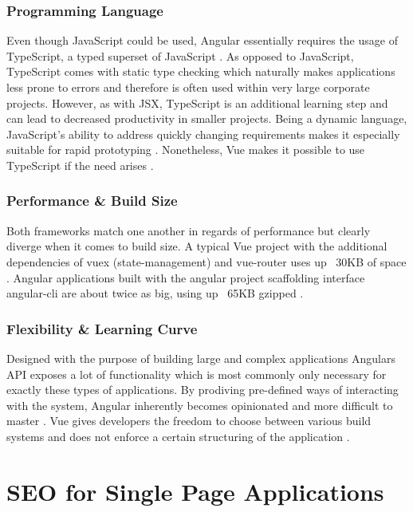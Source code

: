 \subsubsection{Programming Language}
Even though JavaScript could be used, Angular essentially requires the usage of TypeScript, a typed superset of JavaScript \cite{TypeScript:online}. As opposed to JavaScript, TypeScript comes with static type checking which naturally makes applications less prone to errors \cite{DynamicallyTypedLanguages} and therefore is often used within very large corporate projects. However, as with JSX, TypeScript is an additional learning step and can lead to decreased productivity in smaller projects. Being a dynamic language, JavaScript's ability to address quickly changing requirements makes it especially suitable for rapid prototyping \cite[p.~72]{DynamicallyTypedLanguages}. Nonetheless, Vue makes it possible to use TypeScript if the need arises \cite{VueTypeScript:online}.

\subsubsection{Performance \& Build Size}
Both frameworks match one another in regards of performance but clearly diverge when it comes to build size. A typical Vue project with the additional dependencies of vuex (state-management) and vue-router uses up ~30KB of space \cite{ComparisonVue:online}. Angular applications built with the angular project scaffolding interface angular-cli are about twice as big, using up ~65KB gzipped \cite{ComparisonVue:online}.

\subsubsection{Flexibility \& Learning Curve}
Designed with the purpose of building large and complex applications Angulars API exposes a lot of functionality which is most commonly only necessary for exactly these types of applications. By prodiving pre-defined ways of interacting with the system, Angular inherently becomes opinionated and more difficult to master \cite{ComparisonVue:online}. Vue gives developers the freedom to choose between various build systems and does not enforce a certain structuring of the application \cite{ComparisonVue:online}. 


\section{SEO for Single Page Applications}
